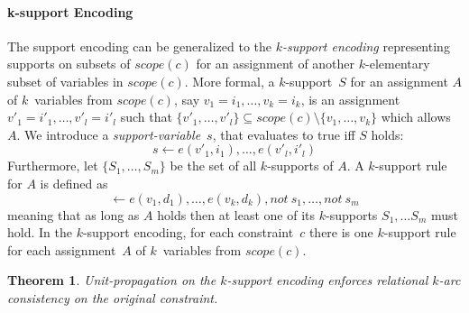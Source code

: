 \documentclass[letterpaper]{article}
\newtheorem{theorem}{Theorem}
\newcommand{\cassignment}{A}
\newcommand{\dneg}{not\ }
\newcommand{\scope}[1]{scope(#1)}
\begin{document}
\paragraph{k-support Encoding}
The support encoding can be generalized to the \emph{$k$-support encoding} \cite{behewa03a} representing supports on subsets of $\scope{c}$ for an assignment of another $k$-elementary subset of variables in $\scope{c}$. More formal, a $k$-support~$S$ for an assignment $\cassignment$ of $k$~variables from $\scope{c}$, say $v_1 = i_1, \dots, v_k = i_k$, is an assignment $v'_1 = i'_1, \dots, v'_l = i'_l$ such that $\{v'_1, \dots, v'_l\} \subseteq \scope{c} \setminus \{v_1, \dots, v_k\}$ which allows $\cassignment$. We introduce a \emph{support-variable}~$s$, that evaluates to true iff $S$ holds:
\[
s \leftarrow e(v'_1, i_1), \dots, e(v'_l, i'_l)
\]
Furthermore, let $\{S_1, \dots, S_m\}$ be the set of all $k$-supports of $\cassignment$. A $k$-support rule for $\cassignment$ is defined as
\[
\leftarrow e(v_1, d_1), \dots, e(v_k, d_k), \dneg s_1, \dots, \dneg s_m
\]
meaning that as long as $\cassignment$ holds then at least one of its $k$-supports $S_1, \dots S_m$ must hold.
In the $k$-support encoding, for each constraint~$c$ there is one $k$-support rule for each assignment~$\cassignment$ of $k$~variables from $\scope{c}$.
\begin{theorem}
Unit-propagation on the $k$-support encoding enforces relational $k$-arc consistency on the original constraint.
\end{theorem}
\end{document}
